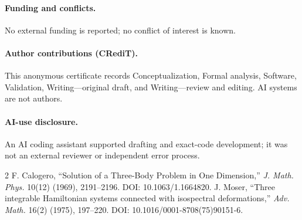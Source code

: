 \documentclass[9pt]{extarticle}
\begin{document}
\paragraph{Funding and conflicts.} No external funding is reported; no
conflict of interest is known.
\paragraph{Author contributions (CRediT).} This anonymous certificate records
Conceptualization, Formal analysis, Software, Validation, Writing---original
draft, and Writing---review and editing.  AI systems are not authors.
\paragraph{AI-use disclosure.} An AI coding assistant supported drafting and
exact-code development; it was not an external reviewer or independent error
process.

\begin{thebibliography}{2}
 F. Calogero, ``Solution of a Three-Body Problem in One
Dimension,'' \emph{J. Math. Phys.} 10(12) (1969), 2191--2196.
DOI: 10.1063/1.1664820.
 J. Moser, ``Three integrable Hamiltonian systems connected with
isospectral deformations,'' \emph{Adv. Math.} 16(2) (1975), 197--220.
DOI: 10.1016/0001-8708(75)90151-6.
\end{thebibliography}
\end{document}
